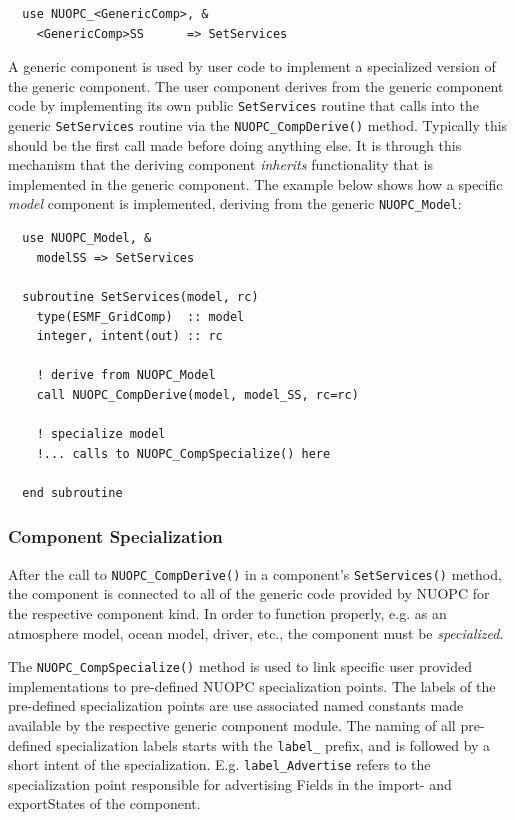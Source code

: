 \begin{verbatim}
  use NUOPC_<GenericComp>, &
    <GenericComp>SS      => SetServices
\end{verbatim}

A generic component is used by user code to implement a specialized version of the generic component. The user component derives from the generic component code by implementing its own public {\tt SetServices} routine that calls into the generic {\tt SetServices} routine via the {\tt NUOPC\_CompDerive()} method.
Typically this should be the first call made before doing anything else. It is through this mechanism that the deriving component {\em inherits} functionality that is implemented in the generic component. The example below shows how a specific {\em model} component is implemented, deriving from the generic {\tt NUOPC\_Model}:

\begin{verbatim}
  use NUOPC_Model, &
    modelSS => SetServices

  subroutine SetServices(model, rc)
    type(ESMF_GridComp)  :: model
    integer, intent(out) :: rc

    ! derive from NUOPC_Model
    call NUOPC_CompDerive(model, model_SS, rc=rc)

    ! specialize model
    !... calls to NUOPC_CompSpecialize() here
    
  end subroutine
\end{verbatim}

\subsubsection{Component Specialization}

After the call to {\tt NUOPC\_CompDerive()} in a component's {\tt SetServices()} method, the component is connected to all of the generic code provided by NUOPC for the respective component kind. In order to function properly, e.g. as an atmosphere model, ocean model, driver, etc., the component must be {\em specialized}.

The {\tt NUOPC\_CompSpecialize()} method is used to link specific user provided implementations to pre-defined NUOPC specialization points. The labels of the pre-defined specialization points are use associated named constants made available by the respective generic component module. The naming of all pre-defined specialization labels starts with the {\tt label\_} prefix, and is followed by a short intent of the specialization. E.g. {\tt label\_Advertise} refers to the specialization point responsible for advertising Fields in the import- and exportStates of the component.

